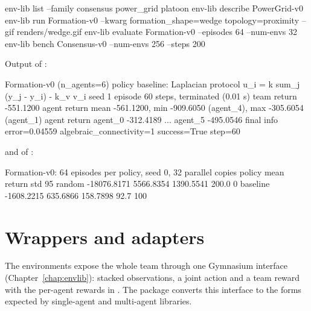 \begin{shellcode}
env-lib list --family consensus power_grid platoon
env-lib describe PowerGrid-v0
env-lib run Formation-v0 --kwarg formation_shape=wedge topology=proximity --gif renders/wedge.gif
env-lib evaluate Formation-v0 --episodes 64 --num-envs 32
env-lib bench Consensus-v0 --num-envs 256 --steps 200
\end{shellcode}

Output of :

\begin{textcode}
Formation-v0 (n_agents=6)
  policy        baseline: Laplacian protocol u_i = k sum_j (y_j - y_i) - k_v v_i
  seed          1
  episode       60 steps, terminated (0.01 s)
  team return   -551.1200
  agent return  mean -561.1200, min -909.6050 (agent_4), max -305.6054 (agent_1)
    agent       return
    agent_0  -312.4189
    ...
    agent_5  -495.0546
  final info    error=0.04559  algebraic_connectivity=1  success=True  step=60
\end{textcode}

and of :

\begin{textcode}
Formation-v0: 64 episodes per policy, seed 0, 32 parallel copies
policy    mean return        std  95%
random    -18076.8171  5566.8354  1390.5541   200.0          0%
baseline   -1608.2215   635.6866   158.7898    92.7        100%
\end{textcode}

\section{Wrappers and adapters}\label{sec:workflow-wrappers}

The environments expose the whole team through one Gymnasium interface
(Chapter~\ref{chap:envlib}): stacked observations, a joint action and a team
reward with the per-agent rewards in . The package
 converts this interface to the forms expected by
single-agent and multi-agent libraries.

